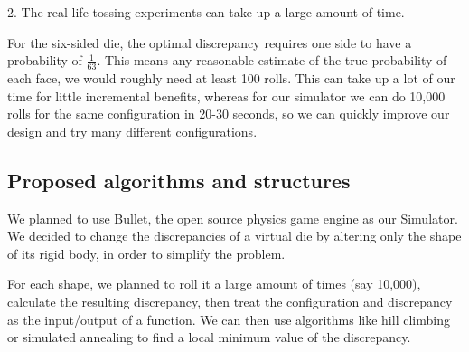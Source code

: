 2. The real life tossing experiments can take up a large amount of time.

For the six-sided die, the optimal discrepancy requires one side to have a probability of ${\frac{1}{63}}$. This means any reasonable estimate of the true probability of each face, we would roughly need at least 100 rolls. This can take up a lot of our time for little incremental benefits, whereas for our simulator we can do 10,000 rolls for the same configuration in 20-30 seconds, so we can quickly improve our design and try many different configurations.

\subsection{Proposed algorithms and structures}
We planned to use Bullet, the open source physics game engine as our Simulator. We decided to change the discrepancies of a virtual die by altering only the shape of its rigid body, in order to simplify the problem. 

For each shape, we planned to roll it a large amount of times (say 10,000), calculate the resulting discrepancy, then treat the configuration and discrepancy as the input/output of a function. We can then use algorithms like hill climbing or simulated annealing to find a local minimum value of the discrepancy.